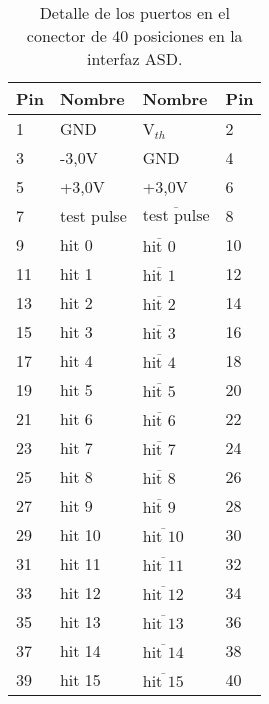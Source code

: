 \begin{table}[]
	\centering
	\begin{tabular}{@{}llll@{}}
		\toprule
		\textbf{Pin} & \textbf{Nombre} & \textbf{Nombre}                & \textbf{Pin} \\ \midrule
		1            & GND             & V$_{th}$                       & 2            \\
		3            & -3,0V           & GND                            & 4            \\
		5            & +3,0V           & +3,0V                          & 6            \\
		7            & test pulse      & $\overline{\mbox{test pulse}}$ & 8            \\
		9            & hit 0           & $\overline{\mbox{hit 0}}$      & 10           \\
		11           & hit 1           & $\overline{\mbox{hit 1}}$      & 12           \\
		13           & hit 2           & $\overline{\mbox{hit 2}}$      & 14           \\
		15           & hit 3           & $\overline{\mbox{hit 3}}$      & 16           \\
		17           & hit 4           & $\overline{\mbox{hit 4}}$      & 18           \\
		19           & hit 5           & $\overline{\mbox{hit 5}}$      & 20           \\
		21           & hit 6           & $\overline{\mbox{hit 6}}$      & 22           \\
		23           & hit 7           & $\overline{\mbox{hit 7}}$      & 24           \\
		25           & hit 8           & $\overline{\mbox{hit 8}}$      & 26           \\
		27           & hit 9           & $\overline{\mbox{hit 9}}$      & 28           \\
		29           & hit 10          & $\overline{\mbox{hit 10}}$     & 30           \\
		31           & hit 11          & $\overline{\mbox{hit 11}}$     & 32           \\
		33           & hit 12          & $\overline{\mbox{hit 12}}$     & 34           \\
		35           & hit 13          & $\overline{\mbox{hit 13}}$     & 36           \\
		37           & hit 14          & $\overline{\mbox{hit 14}}$     & 38           \\
		39           & hit 15          & $\overline{\mbox{hit 15}}$     & 40           \\ \bottomrule
	\end{tabular}
	\caption{Detalle de los puertos en el conector de 40 posiciones en la interfaz ASD.}
	\label{tab:asd-ports}
\end{table}

